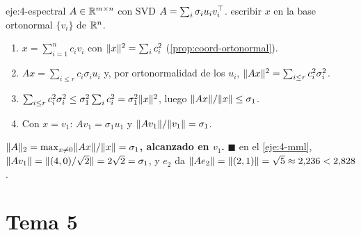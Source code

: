 \begin{solucion}{eje:4-espectral}
\datos $A\in\mathbb{R}^{m\times n}$ con SVD $A=\sum_i\sigma_iu_iv_i^{\top}$.
\planteamiento escribir $x$ en la base ortonormal $\{v_i\}$ de $\mathbb{R}^{n}$.
\pasos
\begin{enumerate}[label=\arabic*.]
  \item $x=\sum_{i=1}^{n}c_iv_i$ con $\lVert x\rVert^{2}=\sum_ic_i^{2}$ (\cref{prop:coord-ortonormal}).
  \item $Ax=\sum_{i\le r}c_i\sigma_iu_i$ y, por ortonormalidad de los $u_i$, $\lVert Ax\rVert^{2}=\sum_{i\le r}c_i^{2}\sigma_i^{2}$.
  \item $\sum_{i\le r}c_i^{2}\sigma_i^{2}\le\sigma_1^{2}\sum_ic_i^{2}=\sigma_1^{2}\lVert x\rVert^{2}$, luego $\lVert Ax\rVert/\lVert x\rVert\le\sigma_1$.
  \item Con $x=v_1$: $Av_1=\sigma_1u_1$ y $\lVert Av_1\rVert/\lVert v_1\rVert=\sigma_1$.
\end{enumerate}
\resultado \textbf{$\lVert A\rVert_2=\max_{x\ne 0}\lVert Ax\rVert/\lVert x\rVert=\sigma_1$, alcanzado en $v_1$.} \hfill$\blacksquare$
\comprobacion en el \cref{eje:4-mml}, $\lVert Av_1\rVert=\lVert(4,0)/\sqrt{2}\rVert=2\sqrt{2}=\sigma_1$, y $e_2$ da $\lVert Ae_2\rVert=\lVert(2,1)\rVert=\sqrt{5}\approx 2{,}236<2{,}828$.
\end{solucion}

\section{Tema 5}

